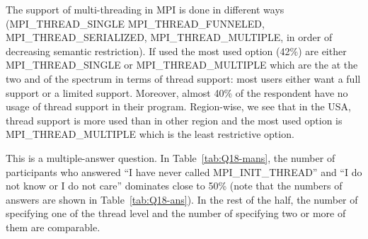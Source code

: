 The support of multi-threading in MPI is done in different ways (MPI\_THREAD\_SINGLE
MPI\_THREAD\_FUNNELED, MPI\_THREAD\_SERIALIZED, MPI\_THREAD\_MULTIPLE, in order of
decreasing semantic restriction). If used the most used option (42\%) are either
MPI\_THREAD\_SINGLE or MPI\_THREAD\_MULTIPLE which are the at the two and of the
spectrum in terms of thread support: most users either want a full support or a
limited support. Moreover, almost 40\% of the respondent have no usage of thread
support in their program. Region-wise, we see that in the USA, thread support is more used
than in other region and the most used option is MPI\_THREAD\_MULTIPLE which is
the least restrictive option. 

This is a multiple-answer question.  In Table~\ref{tab:Q18-mans}, the
number of participants who answered ``I have never called
MPI\_INIT\_THREAD'' and ``I do not know or I do not care'' dominates
close to 50\%  (note that the numbers of answers are shown
in Table~\ref{tab:Q18-ans}). In the rest of the half, the
number of specifying one of the thread level and the number of
specifying two or more of them are comparable. 



